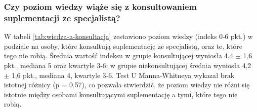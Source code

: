 

\subsubsection{Czy poziom wiedzy wiąże się z konsultowaniem suplementacji ze specjalistą?}

%
%
%

W tabeli \ref{tab:wiedza-a-konsultacja} zestawiono poziom wiedzy (indeks 0‐6 pkt.) w podziale na osoby, które konsultują suplementację ze specjalistą, oraz te, które tego nie robią. Średnia wartość indeksu w grupie konsultującej wyniosła 4,4 $\pm$ 1,6 pkt., mediana 5 oraz kwartyle 3‐6; w grupie niekonsultującej średnia wyniosła 4,2 $\pm$ 1,6 pkt., mediana 4, kwartyle 3‐6. Test U Manna‐Whitneya wykazał brak istotnej różnicy (p = 0,57), co pozwala stwierdzić, że poziom wiedzy nie różni się istotnie między osobami konsultującymi suplementację a tymi, które tego nie robią.


